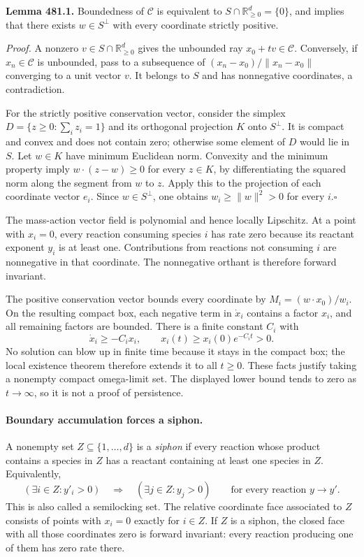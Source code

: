 \documentclass[11pt]{article}
\begin{document}
\textbf{Lemma 481.1.} Boundedness of $\mathcal C$ is equivalent to
$S\cap\mathbb R_{\geq0}^d=\{0\}$, and implies that there exists
$w\in S^\perp$ with every coordinate strictly positive.

\emph{Proof.}
A nonzero $v\in S\cap\mathbb R_{\geq0}^d$ gives the unbounded ray
$x_0+t v\in\mathcal C$. Conversely, if $x_n\in\mathcal C$ is
unbounded, pass to a subsequence of
$(x_n-x_0)/\|x_n-x_0\|$ converging to a unit vector $v$.
It belongs to $S$ and has nonnegative coordinates, a contradiction.

For the strictly positive conservation vector, consider the simplex
$D=\{z\geq0:\sum_i z_i=1\}$ and its orthogonal projection $K$ onto
$S^\perp$. It is compact and convex and does not contain zero; otherwise
some element of $D$ would lie in $S$. Let $w\in K$ have minimum
Euclidean norm. Convexity and the minimum property imply
$w\cdot(z-w)\geq0$ for every $z\in K$, by differentiating the squared
norm along the segment from $w$ to $z$. Apply this to the projection of
each coordinate vector $e_i$. Since $w\in S^\perp$, one obtains
$w_i\geq\|w\|^2>0$ for every $i$.\hfill$\square$

The mass-action vector field is polynomial and hence locally Lipschitz.
At a point with $x_i=0$, every reaction consuming species $i$ has rate
zero because its reactant exponent $y_i$ is at least one. Contributions
from reactions not consuming $i$ are nonnegative in that coordinate.
The nonnegative orthant is therefore forward invariant.

The positive conservation vector bounds every coordinate by
$M_i=(w\cdot x_0)/w_i$. On the resulting compact box, each negative
term in $\dot x_i$ contains a factor $x_i$, and all remaining factors
are bounded. There is a finite constant $C_i$ with
\[
 \dot x_i\geq-C_i x_i,
 \qquad x_i(t)\geq x_i(0)e^{-C_i t}>0.
\]
No solution can blow up in finite time because it stays in the compact
box; the local existence theorem therefore extends it to all $t\geq0$.
These facts justify taking a nonempty compact omega-limit set. The
displayed lower bound tends to zero as $t\to\infty$, so it is not a
proof of persistence.

\paragraph{Boundary accumulation forces a siphon.}
A nonempty set $Z\subseteq\{1,\ldots,d\}$ is a \emph{siphon} if
every reaction whose product contains a species in $Z$ has a reactant
containing at least one species in $Z$. Equivalently,
\[
 (\exists i\in Z:y'_i>0)\quad\Longrightarrow\quad
                         (\exists j\in Z:y_j>0)
 \qquad\text{for every reaction }y\to y'.
\]
This is also called a semilocking set. The relative coordinate face
associated to $Z$ consists of points with $x_i=0$ exactly for $i\in Z$.
If $Z$ is a siphon, the closed face with all those coordinates zero is
forward invariant: every reaction producing one of them has zero rate
there.
\end{document}
